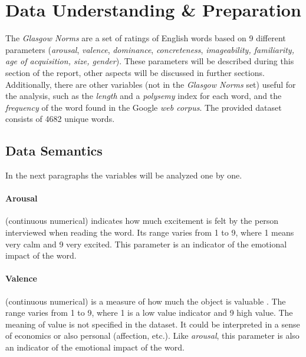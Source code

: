\documentclass[a4paper,11pt,dvipsnames]{article}
\begin{document}
		\makeatother
		\restoregeometry
	\onecolumn \tableofcontents
		\newpage
\section{Data Understanding \& Preparation}
The \textit{Glasgow Norms} are a set of ratings of English words based on 9 different parameters (\textit{arousal}, \textit{valence}, \textit{dominance}, \textit{concreteness}, \textit{imageability, familiarity, age of acquisition, size, gender}). These parameters will be described during this section of the report, other aspects will be discussed in further sections. Additionally, there are other variables (not in the \textit{Glasgow Norms} set) useful for the analysis, such as the \textit{length} and a \textit{polysemy} index for each word, and the \textit{frequency} of the word found in the Google \textit{web corpus}. The provided dataset consists of 4682 unique words. 


\subsection{Data Semantics}\label{semantic}
In the next paragraphs the variables will be analyzed one by one. 




\paragraph{Arousal} (continuous numerical) indicates how much excitement is felt by the person interviewed when reading the word. Its range varies from 1 to 9, where 1 means very calm and 9 very excited. This parameter is an indicator of the emotional impact of the word.
%
\paragraph{Valence} (continuous numerical) is a measure of how much the object is valuable . The range varies from 1 to 9, where 1 is a low value indicator and 9 high value. The meaning of value is not specified in the dataset. It could be interpreted in a sense of economics or also personal (affection, etc.). Like \textit{arousal}, this parameter is also an indicator of the emotional impact of the word.
%
\end{document}
